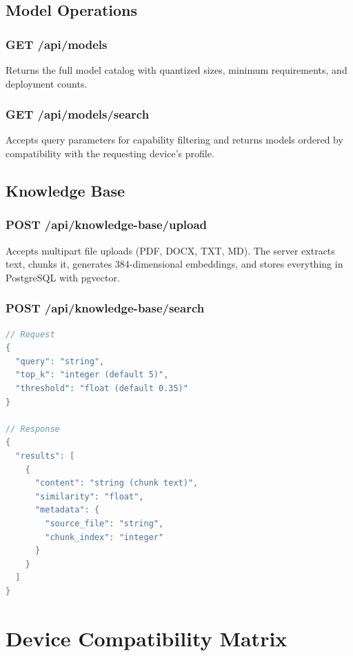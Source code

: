 \documentclass[12pt, letterpaper, twoside]{report}
\begin{document}
\section{Model Operations}

\subsection{GET /api/models}
Returns the full model catalog with quantized sizes, minimum requirements, and deployment counts.

\subsection{GET /api/models/search}
Accepts query parameters for capability filtering and returns models ordered by compatibility with the requesting device's profile.

\section{Knowledge Base}

\subsection{POST /api/knowledge-base/upload}
Accepts multipart file uploads (PDF, DOCX, TXT, MD). The server extracts text, chunks it, generates 384-dimensional embeddings, and stores everything in PostgreSQL with pgvector.

\subsection{POST /api/knowledge-base/search}
\begin{lstlisting}[language=Java, caption={Knowledge base search}]
// Request
{
  "query": "string",
  "top_k": "integer (default 5)",
  "threshold": "float (default 0.35)"
}

// Response
{
  "results": [
    {
      "content": "string (chunk text)",
      "similarity": "float",
      "metadata": {
        "source_file": "string",
        "chunk_index": "integer"
      }
    }
  ]
}
\end{lstlisting}

\chapter{Device Compatibility Matrix}
\label{app:compatibility}
\end{document}
